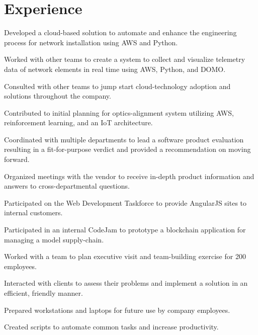 \documentclass[]{deedy-resume-reversed}
\begin{document}
\begin{minipage}[t]{0.60\textwidth}
\section{Experience}
\vspace{\topsep} %
\begin{tightemize}
\item Developed a cloud-based solution to automate and enhance the engineering process for network installation using AWS and Python.
\item Worked with other teams to create a system to collect and visualize telemetry data of network elements in real time using AWS, Python, and DOMO.
\item Consulted with other teams to jump start cloud-technology adoption and solutions throughout the company.
\item Contributed to initial planning for optics-alignment system utilizing AWS, reinforcement learning, and an IoT architecture.
\end{tightemize}
\sectionsep
{}
\begin{tightemize}
\item Coordinated with multiple departments to lead a software product evaluation resulting in a fit-for-purpose verdict and provided a recommendation on moving forward.
\item Organized meetings with the vendor to receive in-depth product information and answers to cross-departmental questions.
\item Participated on the Web Development Taskforce to provide AngularJS sites to internal customers.
\item Participated in an internal CodeJam to prototype a blockchain application for managing a model supply-chain.
\item Worked with a team to plan executive visit and team-building exercise for 200 employees.
\end{tightemize}
\sectionsep
{}
\begin{tightemize}
\item Interacted with clients to assess their problems and implement a solution in an efficient, friendly manner.
\item Prepared workstations and laptops for future use by company employees.
\item Created scripts to automate common tasks and increase productivity.
\end{tightemize}
\sectionsep

\end{minipage}
\end{document}
